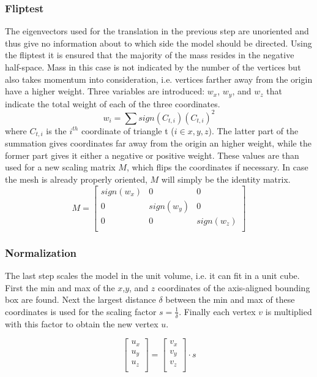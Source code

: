 \documentclass{bigdata}
\begin{document}
\subsubsection{Fliptest}
The eigenvectors used for the translation in the previous step are unoriented and thus give no information about to which side the model should be directed. Using the fliptest it is ensured that the majority of the mass resides in the negative half-space. Mass in this case is not indicated by the number of the vertices but also takes momentum into consideration, i.e. vertices farther away from the origin have a higher weight. Three variables are introduced: $w_x$, $w_y$, and $w_z$ that indicate the total weight of each of the three coordinates. 
\begin{equation}
w_i = \sum sign(C_{t,i})(C_{t,i})^2
\end{equation}
 where $C_{t,i}$ is the $i^{th}$ coordinate of triangle t ($i \in {x,y,z}$). The latter part of the summation gives coordinates far away from the origin an higher weight, while the former part gives it either a negative or positive weight. These values are than used for a new scaling matrix $M$, which flips the coordinates if necessary. In case the mesh is already properly oriented, $M$ will simply be the identity matrix.
\[
M = 
\begin{bmatrix}
sign(w_x) & 0 & 0 \\
0 & sign(w_y) & 0 \\
0 & 0 & sign(w_z) \\
\end{bmatrix}
\]

\subsubsection{Normalization}

The last step scales the model in the unit volume, i.e. it can fit in a unit cube. First the min and max of the $x$,$y$, and $z$ coordinates of the axis-aligned bounding box are found. Next the largest distance $\delta$ between the min and max of these coordinates is used for the scaling factor $s = \frac{1}{\delta}$. Finally each vertex $v$ is multiplied with this factor to obtain the new vertex $u$.

\[
\begin{bmatrix}
u_x \\
u_y \\
u_z \\
\end{bmatrix}
=
\begin{bmatrix}
v_x \\
v_y \\
v_z \\
\end{bmatrix}
\cdot s
\]
\end{document}
